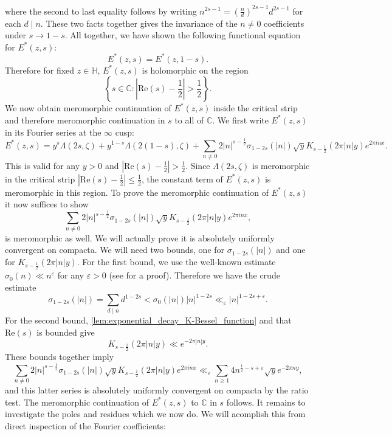 \documentclass[12pt]{book}
\theoremstyle{definition}\newframedtheorem{method}{Method}
\newcommand{\C}{\mathbb{C}}
\renewcommand{\H}{\mathbb{H}}
\newcommand{\z}{\zeta}
\newcommand{\s}{\sigma}
\renewcommand{\L}{\Lambda}
\newcommand{\e}{\varepsilon}
\newcommand{\<}{\langle}
\renewcommand{\>}{\rangle}
\renewcommand{\Re}{\mathrm{Re}}
\begin{document}
      where the second to last equality follows by writing $n^{2s-1} = \left(\frac{n}{d}\right)^{2s-1}d^{2s-1}$ for each $d \mid n$. These two facts together gives the invariance of the $n \neq 0$ coefficients under $s \to 1-s$. All together, we have shown the following functional equation for $E^{\ast}(z,s)$:
      \[
        E^{\ast}(z,s) = E^{\ast}(z,1-s).
      \]
      Therefore for fixed $z \in \H$, $E^{\ast}(z,s)$ is holomorphic on the region
      \[
        \left\{s \in \C:\left|\Re(s)-\frac{1}{2}\right| > \frac{1}{2}\right\}.
      \]
      We now obtain meromorphic continuation of $E^{\ast}(z,s)$ inside the critical strip and therefore meromorphic continuation in $s$ to all of $\C$. We first write $E^{\ast}(z,s)$ in its Fourier series at the $\infty$ cusp:
      \[
        E^{\ast}(z,s) = y^{s}\L(2s,\z)+y^{1-s}\L(2(1-s),\z)+\sum_{n \neq 0}2|n|^{s-\frac{1}{2}}\s_{1-2s}(|n|)\sqrt{y}K_{s-\frac{1}{2}}(2\pi|n|y)e^{2\pi inx}.
      \]
      This is valid for any $y > 0$ and $|\Re(s)-\frac{1}{2}| > \frac{1}{2}$. Since $\L(2s,\z)$ is meromorphic in the critical strip $|\Re(s)-\frac{1}{2}| \le \frac{1}{2}$, the constant term of $E^{\ast}(z,s)$ is meromorphic in this region. To prove the meromorphic continuation of $E^{\ast}(z,s)$ it now suffices to show
      \[
        \sum_{n \neq 0}2|n|^{s-\frac{1}{2}}\s_{1-2s}(|n|)\sqrt{y}K_{s-\frac{1}{2}}(2\pi|n|y)e^{2\pi inx},
      \]
      is meromorphic as well. We will actually prove it is absolutely uniformly convergent on compacta. We will need two bounds, one for $\s_{1-2s}(|n|)$ and one for $K_{s-\frac{1}{2}}(2\pi|n|y)$. For the first bound, we use the well-known estimate $\s_{0}(n) \ll n^{\e}$ for any $\e > 0$ (see \cite{montgomery2007multiplicative} for a proof). Therefore we have the crude estimate
      \[
        \s_{1-2s}(|n|) = \sum_{d \mid n}d^{1-2s} < \s_{0}(|n|)|n|^{1-2s} \ll_{\e}|n|^{1-2s+\e}.
      \]
      For the second bound, \cref{lem:exponential_decay_K-Bessel_function} and that $\Re(s)$ is bounded give
      \[
        K_{s-\frac{1}{2}}(2\pi|n|y) \ll e^{-2\pi|n|y}.
      \]
      These bounds together imply
      \begin{equation}\label{equ:non_constant_Fourier_coefficient_bound_non_holomorphic_Eisenstein_series}
        \sum_{n \neq 0}2|n|^{s-\frac{1}{2}}\s_{1-2s}(|n|)\sqrt{y}K_{s-\frac{1}{2}}(2\pi|n|y)e^{2\pi inx} \ll_{\e} \sum_{n \ge 1}4n^{\frac{1}{2}-s+\e}\sqrt{y}e^{-2\pi ny},
      \end{equation}
      and this latter series is absolutely uniformly convergent on compacta by the ratio test. The meromorphic continuation of $E^{\ast}(z,s)$ to $\C$ in $s$ follows. It remains to investigate the poles and residues which we now do. We will acomplish this from direct inspection of the Fourier coefficients:
\end{document}
